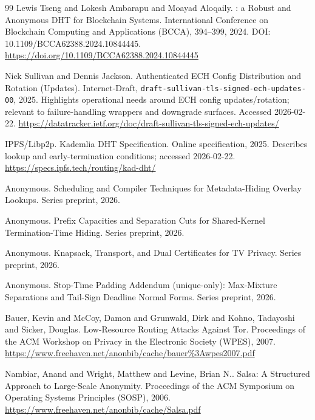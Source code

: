 \documentclass[11pt]{article}
\begin{document}
\begin{thebibliography}{99}
Lewis Tseng and Lokesh Ambarapu and Moayad Aloqaily.
: a Robust and Anonymous {DHT} for Blockchain Systems.
\newblock International Conference on Blockchain Computing and Applications (BCCA), 394--399, 2024.
\newblock DOI: 10.1109/BCCA62388.2024.10844445.
\newblock \url{https://doi.org/10.1109/BCCA62388.2024.10844445}

Nick Sullivan and Dennis Jackson.
\newblock Authenticated {ECH} Config Distribution and Rotation (Updates).
\newblock Internet-Draft, \texttt{draft-sullivan-tls-signed-ech-updates-00}, 2025.
\newblock Highlights operational needs around ECH config updates/rotation; relevant to failure-handling wrappers and downgrade surfaces. Accessed 2026-02-22.
\newblock \url{https://datatracker.ietf.org/doc/draft-sullivan-tls-signed-ech-updates/}

{IPFS/Libp2p}.
 Kademlia {DHT} Specification.
\newblock Online specification, 2025.
\newblock Describes lookup and early-termination conditions; accessed 2026-02-22.
\newblock \url{https://specs.ipfs.tech/routing/kad-dht/}

{Anonymous}.
\newblock Scheduling and Compiler Techniques for Metadata-Hiding Overlay Lookups.
\newblock Series preprint, 2026.

{Anonymous}.
\newblock Prefix Capacities and Separation Cuts for Shared-Kernel Termination-Time Hiding.
\newblock Series preprint, 2026.

{Anonymous}.
\newblock Knapsack, Transport, and Dual Certificates for {TV} Privacy.
\newblock Series preprint, 2026.

{Anonymous}.
\newblock Stop-Time Padding Addendum (unique-only): Max-Mixture Separations and Tail-Sign Deadline Normal Forms.
\newblock Series preprint, 2026.

Bauer, Kevin and McCoy, Damon and Grunwald, Dirk and Kohno, Tadayoshi and Sicker, Douglas.
\newblock Low-Resource Routing Attacks Against Tor.
\newblock Proceedings of the ACM Workshop on Privacy in the Electronic Society (WPES), 2007.
\newblock \url{https://www.freehaven.net/anonbib/cache/bauer%3Awpes2007.pdf}

Nambiar, Anand and Wright, Matthew and Levine, Brian N..
\newblock Salsa: A Structured Approach to Large-Scale Anonymity.
\newblock Proceedings of the ACM Symposium on Operating Systems Principles (SOSP), 2006.
\newblock \url{https://www.freehaven.net/anonbib/cache/Salsa.pdf}


\end{thebibliography}
\end{document}
